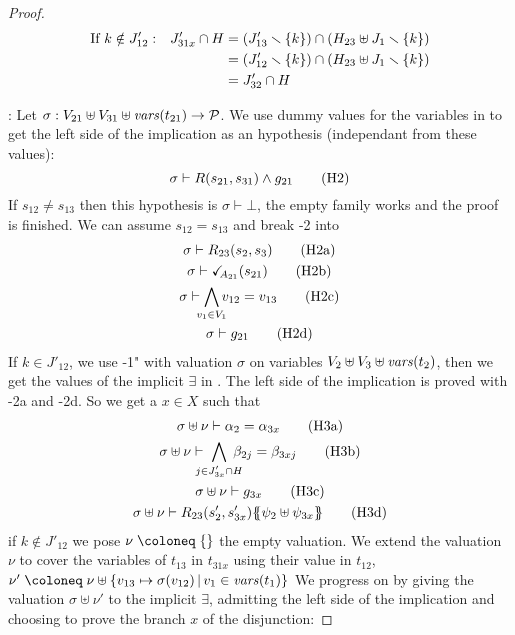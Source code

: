 \documentclass{article}
\begin{document}
\begin{proof}
\begin{align*}
		\text{If } k \notin J'_{12}: && J'_{31x} \cap H & = {\left(J'_{13} \smallsetminus {\left\{k\right\}}\right)} \cap {\left(H_{23} \uplus J_1 \smallsetminus{\left\{k\right\}}\right)} \\
		&&& = {\left(J'_{12} \smallsetminus {\left\{k\right\}}\right)} \cap {\left(H_{23} \uplus J_1 \smallsetminus{\left\{k\right\}}\right)} \\
		&&& = J'_{32} \cap H
	\end{align*}
\item[\goal{2}:] Let \(\sigma: V_{21} \uplus V_{31} \uplus \mathit{vars}{\left(t_{21}\right)} \to \mathcal{P}\).
	We use dummy values for the variables in  to get the left side of the implication as an hypothesis (independant from these values):
	\[ \sigma \vdash R\mpar{s_{21}, s_{31}} \wedge g_{21} \hyp{2} \]
	If \(s_{12} \neq s_{13}\) then this hypothesis is \(\sigma \vdash \bot\), the empty family works and the proof is finished.
	We can assume \(s_{12} = s_{13}\) and break \hyp{2} into
	\begin{gather}
		\sigma \vdash R_{23}\mpar{s_2, s_3} \hyp{2a} \\
		\sigma \vdash \reach{A_{21}}\mpar{s_{21}} \hyp{2b} \\
		\sigma \vdash \bigwedge_\subbox{v_1 \in V_1} v_{12} = v_{13} \hyp{2c} \\
		\sigma \vdash g_{21} \hyp{2d}
	\end{gather}
	If \(k \in J'_{12}\), we use \hyp{1"} with valuation \(\sigma\) on variables \(V_2 \uplus V_3 \uplus \mathit{vars}{\left(t_2\right)}\), then we get the values of the implicit \(\exists\) in .
	The left side of the implication is proved with \hyp{2a} and \hyp{2d}.
	So we get a \(x \in X\) such that
	\begin{gather}
		\sigma \uplus \nu \vdash \alpha_2 = \alpha_{3x} \hyp{3a} \\
		\sigma \uplus \nu \vdash \bigwedge_\subbox{j \in J'_{3x} \cap H} \beta_{2j} = \beta_{3xj} \hyp{3b} \\
		\sigma \uplus \nu \vdash g_{3x} \hyp{3c} \\
		\sigma \uplus \nu \vdash R_{23}\mpar{s'_2, s'_{3x}}\psubst{\psi_2 \uplus \psi_{3x}} \hyp{3d}
	\end{gather}
	if \(k \notin J'_{12}\) we pose \(\nu \defobject \mbrc{}\) the empty valuation.
	We extend the valuation \(\nu\) to cover the variables of \(t_{13}\) in \(t_{31x}\) using their value in \(t_{12}\), \(\nu' \defobject \nu \uplus \mset{v_{13} \mapsto \sigma\mpar{v_{12}}}{v_1 \in \fvars{t_1}}\)
	We progress on  by giving the valuation \(\sigma \uplus \nu'\) to the implicit \(\exists\), admitting the left side of the implication and choosing to prove the branch \(x\) of the disjunction:

\end{proof}
\end{document}
